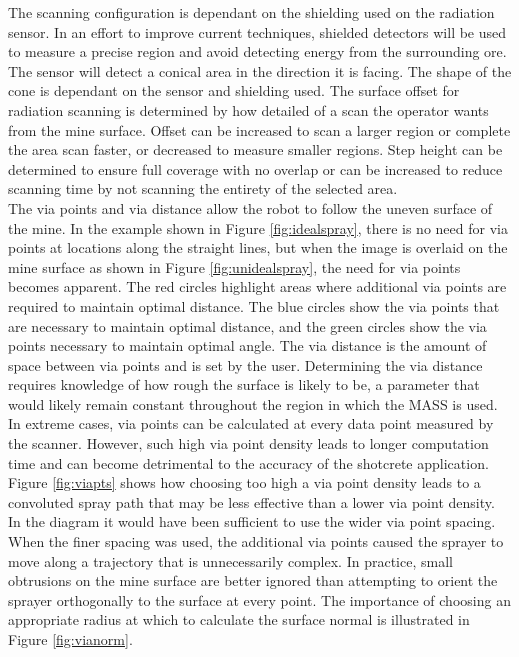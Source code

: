 The scanning configuration is dependant on the shielding used on the radiation sensor. In an effort to improve current techniques, shielded detectors will be used to measure a precise region and avoid detecting energy from the surrounding ore. The sensor will detect a conical area in the direction it is facing. The shape of the cone is dependant on the sensor and shielding used. The surface offset for radiation scanning is determined by how detailed of a scan the operator wants from the mine surface. Offset can be increased to scan a larger region or complete the area scan faster, or decreased to measure smaller regions. Step height can be determined to ensure full coverage with no overlap or can be increased to reduce scanning time by not scanning the entirety of the selected area.\\

The via points and via distance allow the robot to follow the uneven surface of the mine. In the example shown in Figure \ref{fig:idealspray}, there is no need for via points at locations along the straight lines, but when the image is overlaid on the mine surface as shown in Figure \ref{fig:unidealspray}, the need for via points becomes apparent. The red circles highlight areas where additional via points are required to maintain optimal distance. The blue circles show the via points that are necessary to maintain optimal distance, and the green circles show the via points necessary to maintain optimal angle. The via distance is the amount of space between via points and is set by the user. Determining the via distance requires knowledge of how rough the surface is likely to be, a parameter that would likely remain constant throughout the region in which the MASS is used. In extreme cases, via points can be calculated at every data point measured by the scanner. However, such high via point density leads to longer computation time and can become detrimental to the accuracy of the shotcrete application. Figure \ref{fig:viapts} shows how choosing too high a via point density leads to a convoluted spray path that may be less effective than a lower via point density. In the diagram it would have been sufficient to use the wider via point spacing. When the finer spacing was used, the additional via points caused the sprayer to move along a trajectory that is unnecessarily complex. In practice, small obtrusions on the mine surface are better ignored than attempting to orient the sprayer orthogonally to the surface at every point. The importance of choosing an appropriate radius at which to calculate the surface normal is illustrated in Figure \ref{fig:vianorm}.\\

